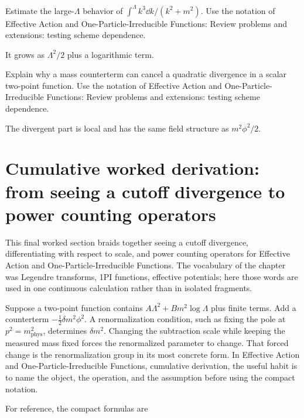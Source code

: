 \begin{exercise}
Estimate the large-\(\Lambda\) behavior of \(\int^\Lambda k^3\dd k/(k^2+m^2)\).  Use the notation of Effective Action and One-Particle-Irreducible Functions: Review problems and extensions: testing scheme dependence.
\begin{answer}
It grows as \(\Lambda^2/2\) plus a logarithmic term.
\end{answer}
\end{exercise}

\begin{exercise}
Explain why a mass counterterm can cancel a quadratic divergence in a scalar two-point function.  Use the notation of Effective Action and One-Particle-Irreducible Functions: Review problems and extensions: testing scheme dependence.
\begin{answer}
The divergent part is local and has the same field structure as \(m^2\phi^2/2\).
\end{answer}
\end{exercise}



\section{Cumulative worked derivation: from seeing a cutoff divergence to power counting operators}

This final worked section braids together seeing a cutoff divergence, differentiating with respect to scale, and power counting operators for Effective Action and One-Particle-Irreducible Functions.  The vocabulary of the chapter was Legendre transforms, 1PI functions, effective potentials; here those words are used in one continuous calculation rather than in isolated fragments.

Suppose a two-point function contains \(A\Lambda^2+B m^2\log\Lambda\) plus finite terms.  Add a counterterm \(-\frac12\delta m^2\phi^2\).  A renormalization condition, such as fixing the pole at \(p^2=m_{\mathrm{phys}}^2\), determines \(\delta m^2\).  Changing the subtraction scale while keeping the measured mass fixed forces the renormalized parameter to change.  That forced change is the renormalization group in its most concrete form.  In Effective Action and One-Particle-Irreducible Functions, cumulative derivation, the useful habit is to name the object, the operation, and the assumption before using the compact notation.

For reference, the compact formulas are

